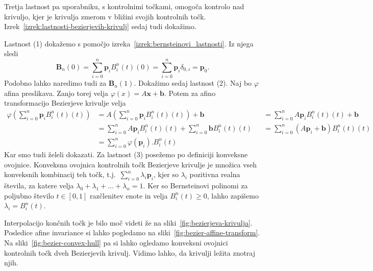 \documentclass[isrm2, tisk]{fmfdelo}
\newcommand{\p}{\textbf{p}}
\newcommand{\lilb}[2]{B_{#1}^{#2}(t)}
\newcommand{\bigbbod}[2]{\textbf{B}_{#1}(#2)}
\newcommand{\bernsteinsumtritri}[3]{\sum_{#1=0}^{#2} #3\lilb{#1}{#2}}
\begin{document}
    Tretja lastnost pa uporabniku, s kontrolnimi točkami, omogoča kontrolo nad krivuljo, kjer je krivulja zmerom v bližini svojih kontrolnih točk.
    Izrek~\ref{izrek:lastnosti-bezierjevih-krivulj} sedaj tudi dokažimo.
    \begin{dokaz}
        \noindent Lastnost (1) dokažemo s pomočjo izreka~\ref{izrek:bernsteinovi_lastnosti}.
        Iz njega sledi
        \[ \bigbbod{n}{0}=\sum_{i=0}^{n}\p_{i}B_i^n(t)(0) = \sum_{i=0}^{n}\p_{i}\delta_{0,i} = \p_0.\]%
        Podobno lahko naredimo tudi za $\bigbbod{n}{1}.$
        Dokažimo sedaj lastnost (2).
        Naj bo $\varphi$ afina preslikava.
        Zanjo torej velja $\varphi(x) = A\mathbf{x} + \mathbf{b}$.
        Potem za afino transformacijo Bezierjeve krivulje velja
        \begin{align*}
            \varphi\left(\sum_{i=0}^{n}\p_{i}B_i^n(t)(t)\right) &= A\left(\sum_{i=0}^{n}\p_{i}B_i^n(t)(t)\right) + \mathbf{b} &&=  \sum_{i=0}^{n}A\p_{i}B_i^n(t)(t) + \mathbf{b}  \\
            &= \sum_{i=0}^{n}A\p_{i}B_i^n(t)(t) + \sum_{i=0}^{n}\mathbf{b}B_i^n(t)(t) &&= \sum_{i=0}^{n}(A\p_{i}+\mathbf{b})B_i^n(t)(t) \\
            &= \bernsteinsumtritri{i}{n}{\varphi(\p_i).}
        \end{align*}
        Kar smo tudi želeli dokazati.
        Za lastnost (3) posežemo po definiciji konveksne ovojnice.
        Konveksna ovojnica kontrolnih točk Bezierjeve krivulje je množica vseh konveksnih kombinacij teh točk, t.j.\ $\sum_{i=0}^{n}\lambda_i\p_{i}$, kjer so $\lambda_i$ pozitivna realna števila, za katere velja $\lambda_0 + \lambda_1 + \dots + \lambda_n = 1$.
        Ker so Bernsteinovi polinomi za poljubno število $t\in[0,1]$ razčlenitev enote in velja $B_i^n(t)\geq0$, lahko zapišemo $\lambda_i=B_i^n(t)$.
    \end{dokaz}
    Interpolacijo končnih točk je bilo moč videti že na sliki~\ref{fig:bezierjeva-krivulja}.
    Posledice afine invariance si lahko pogledamo na sliki~\ref{fig:bezier-affine-transform}.
    Na sliki~\ref{fig:bezier-convex-hull} pa si lahko ogledamo konveksni ovojnici kontrolnih točk dveh Bezierjevih krivulj.
    Vidimo lahko, da krivulji ležita znotraj njih.
\end{document}
